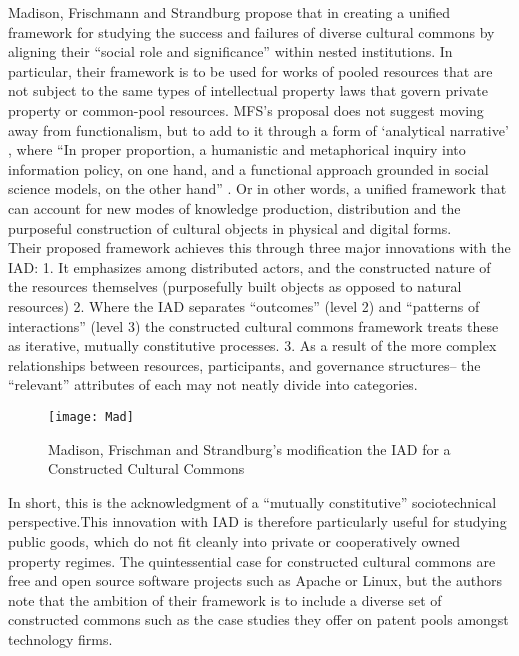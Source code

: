 Madison, Frischmann and Strandburg propose that in creating a unified
framework for studying the success and failures of diverse cultural
commons by aligning their ``social role and significance'' within nested
institutions. In particular, their framework is to be used for works of
pooled resources that are not subject to the same types of intellectual
property laws that govern private property or common-pool resources.
MFS's proposal does not suggest moving away from functionalism, but to
add to it through a form of `analytical narrative' \citep{bates2000analytical},
where ``In proper proportion, a humanistic and metaphorical inquiry into
information policy, on one hand, and a functional approach grounded in
social science models, on the other hand'' \citep[p. 673]{madison2010constructing}. Or in other
words, a unified framework that can account for new modes of knowledge
production, distribution and the purposeful construction of cultural
objects in physical and digital forms.\\

Their proposed framework achieves
this through three major innovations with the IAD: 1. It emphasizes among
distributed actors, and the constructed nature of the resources
themselves (purposefully built objects as opposed to natural
resources) 2. Where the IAD separates ``outcomes'' (level 2) and
``patterns of interactions'' (level 3) the constructed cultural commons
framework treats these as iterative, mutually constitutive processes. 3.
As a result of the more complex relationships between resources,
participants, and governance structures-- the ``relevant'' attributes of
each may not neatly divide into categories.\\ 

\begin{figure}
\centering
\texttt{[image: Mad]}
\caption{Madison, Frischman and Strandburg's modification the IAD for a Constructed Cultural Commons \citep{madison2010constructing}}
\label{fig:my_label}
\end{figure}

In short, this is the acknowledgment of a ``mutually constitutive'' sociotechnical
perspective.This innovation with IAD is therefore particularly useful
for studying public goods, which do not fit cleanly into private or
cooperatively owned property regimes. The quintessential case for
constructed cultural commons are free and open source software projects
such as Apache or Linux, but the authors note that the ambition of their
framework is to include a diverse set of constructed commons such as the
case studies they offer on patent pools amongst technology firms.\\
\\

